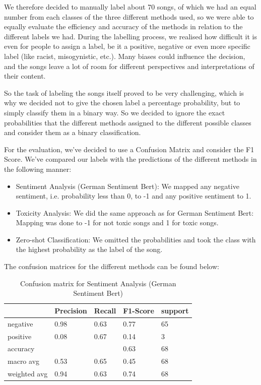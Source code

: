 We therefore decided to manually label about 70 songs, of which we had an equal number from each classes of the three different methods used, so we were able to equally evaluate the efficiency and accuracy of the methods in relation to the different labels we had. During the labelling process, we realised how difficult it is even for people to assign a label, be it a positive, negative or even more specific label (like racist, misogynistic, etc.). Many biases could influence the decision, and the songs leave a lot of room for different perspectives and interpretations of their content. 

So the task of labeling the songs itself proved to be very challenging, which is why we decided not to give the chosen label a percentage probability, but to simply classify them in a binary way. So we decided to ignore the exact probabilities that the different methods assigned to the different possible classes and consider them as a binary classification.

For the evaluation, we've decided to use a Confusion Matrix and consider the F1 Score.
We've compared our labels with the predictions of the different methods in the following manner:
\begin{itemize}
    \item Sentiment Analysis (German Sentiment Bert): We mapped any negative sentiment, i.e. probability less than 0, to -1 and any positive sentiment to 1.
    \item Toxicity Analysis: We did the same approach as for German Sentiment Bert: Mapping was done to -1 for not toxic songs and 1 for toxic songs.
    \item Zero-shot Classification: We omitted the probabilities and took the class with the highest probability as the label of the song.
\end{itemize}

The confusion matrices for the different methods can be found below:

\begin{table}[!htb]
    \centering
    \begin{tabular}{l|llll}
     & Precision & Recall & F1-Score & support \\ \hline \hline
    negative & 0.98 & 0.63 & 0.77 & 65\\
    positive & 0.08 & 0.67 & 0.14 & 3 \\ \hline
    accuracy & & & 0.63 & 68\\
    macro avg & 0.53 & 0.65 & 0.45 & 68 \\
    weighted avg & 0.94 & 0.63 & 0.74 & 68\\
    \end{tabular}
    \caption{Confusion matrix for Sentiment Analysis (German Sentiment Bert)}
    \label{tab:confusion_matrix_sentiment}
\end{table}

